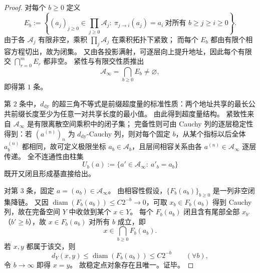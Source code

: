 \begin{proof}
对每个 \(b\ge 0\) 定义
\[
E_b:=\left\{
(a_j)_{j\ge 0}\in\prod_{j\ge 0}\mathcal A_j:\ 
\pi_{j\to i}(a_j)=a_i\ \text{对所有 }b\ge j\ge i\ge 0
\right\}.
\]
由于各 \(\mathcal A_j\) 有限非空，乘积 \(\prod_j \mathcal A_j\) 在乘积拓扑下紧致；
而每个 \(E_b\) 都由有限个相容方程切出，故为闭集。
又由各投影满射，可逐层向上提升地址，因此每个有限交 \(\bigcap_{r=0}^{m}E_r\) 都非空。
紧性与有限交性质推出
\[
\mathcal A_\infty=\bigcap_{b\ge 0}E_b\neq\varnothing,
\]
即得第 \(1\) 条。

第 \(2\) 条中，\(d_{\mathrm{dy}}\) 的超三角不等式是前缀超度量的标准性质：两个地址共享的最长公共前缀长度至少为任意一对共享长度的最小值。
由此得到超度量结构。
紧致性来自 \(\mathcal A_\infty\) 是有限离散空间乘积中的闭子集；
完备性则可由 Cauchy 列的逐层稳定性得到：若 \((a^{(n)})_n\) 为 \(d_{\mathrm{dy}}\)-Cauchy 列，则对每个固定 \(b\)，从某个指标以后全体 \(a^{(n)}_b\) 都相同，故可定义极限坐标 \(a_b\in\mathcal A_b\)，且层间相容关系由各 \(a^{(n)}\in\mathcal A_\infty\) 逐层传递。
全不连通性由柱集
\[
U_b(a):=\{a'\in\mathcal A_\infty:\ a'_b=a_b\}
\]
既开又闭且形成基直接给出。

对第 \(3\) 条，固定 \(a=(a_b)\in\mathcal A_\infty\)。
由相容性假设，\(\{F_b(a_b)\}_{b\ge 0}\) 是一列非空闭集降链。
又因 \(\operatorname{diam}(F_b(a_b))\le C2^{-b}\to 0\)，可取 \(x_b\in F_b(a_b)\) 得到 Cauchy 列，故在完备空间 \(Y\) 中收敛到某个 \(x\in Y\)。
每个 \(F_b(a_b)\) 闭且含有尾部全部 \(x_{b'}\)（\(b'\ge b\)），故 \(x\in F_b(a_b)\) 对所有 \(b\) 成立，即
\[
x\in\bigcap_{b\ge 0}F_b(a_b).
\]
若 \(x,y\) 都属于该交，则
\[
d_Y(x,y)\le \operatorname{diam}(F_b(a_b))\le C2^{-b}
\qquad(\forall b),
\]
令 \(b\to\infty\) 即得 \(x=y\)。
故稳定点对象存在且唯一。证毕。
\end{proof}

